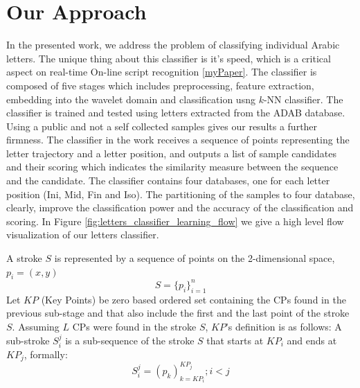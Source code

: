 \documentclass[10pt, conference, compsocconf]{IEEEtran}
\theoremstyle{definition}
\begin{document}
\section{Our Approach}
\label{sec:approach}
In the presented work, we address the problem of classifying individual Arabic letters.
The unique thing about this classifier is it's speed, which is a critical aspect on real-time On-line script recognition \ref{myPaper}.
The classifier is composed of five stages which includes preprocessing, feature extraction, embedding into the wavelet domain and classification usng $k$-NN classifier.
The classifier is trained and tested using letters extracted from the ADAB database. 
Using a public and not a self collected samples gives our results a further firmness.
The classifier in the work receives a sequence of points representing the letter trajectory and a letter position, and outputs a list of sample candidates and their scoring which indicates the similarity measure between the sequence and the candidate.
The classifier contains four databases, one for each letter position (Ini, Mid, Fin and Iso). 
The partitioning of the samples to four database, clearly, improve the classification power and the accuracy of the classification and scoring.
In Figure \ref{fig:letters_classifier_learning_flow} we give a high level flow visualization of our letters classifier.

A stroke $S$ is represented by a sequence of points on the 2-dimensional space, $p_{i}=(x,y)$ 
\begin{equation}
S=\{p_{i}\}_{i=1}^{n}
\end{equation}
Let $KP$ (Key Points) be zero based ordered set containing the CPs found in the previous sub-stage and that also include the first and the last point of the stroke $S$. Assuming $L$ CPs were found in the stroke $S$, $KP$'s definition is as follows:
A sub-stroke $S_{i}^{j}$ is a sub-sequence of the stroke $S$ that starts at $KP_{i}$ and ends at $KP_{j}$, formally:
\begin{equation}
S_{i}^{j}=(p_{k})_{k=KP_{i}}^{KP_{j}}; i<j
\end{equation}
\end{document}
